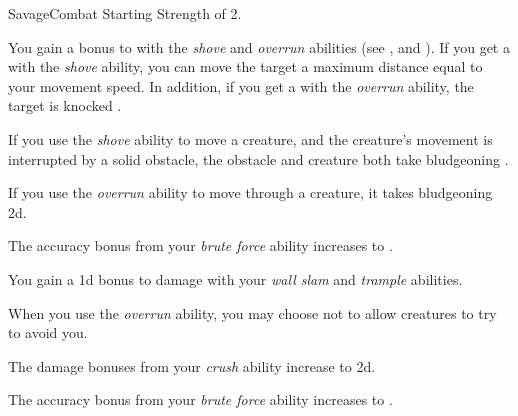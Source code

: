     \begin{feat}{Savage}{Combat}
        \featpre Starting Strength of 2.

         You gain a  bonus to  with the \textit{shove} and \textit{overrun} abilities (see , and ).
        If you get a  with the \textit{shove} ability, you can move the target a maximum distance equal to your movement speed.
        In addition, if you get a  with the \textit{overrun} ability, the target is knocked .

         If you use the \textit{shove} ability to move a creature, and the creature's movement is interrupted by a solid obstacle, the obstacle and creature both take bludgeoning .

         If you use the \textit{overrun} ability to move through a creature, it takes bludgeoning  \minus2d.

         The accuracy bonus from your \textit{brute force} ability increases to .

         You gain a \plus1d bonus to damage with your \textit{wall slam} and \textit{trample} abilities.

         When you use the \textit{overrun} ability, you may choose not to allow creatures to try to avoid you.

         The damage bonuses from your \textit{crush} ability increase to \plus2d.

         The accuracy bonus from your \textit{brute force} ability increases to .
    \end{feat}

